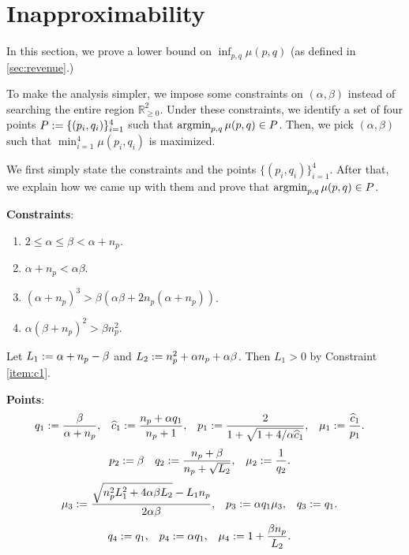 \section{Inapproximability}

In this section, we prove a lower bound on $\inf_{p, q} \mu(p, q)$ (as defined in \cref{sec:revenue}.)

To make the analysis simpler, we impose some constraints on $(\alpha, \beta)$
instead of searching the entire region $\mathbb{R}_{\ge 0}^2$.
Under these constraints, we identify a set of four points $P := \{(p_i, q_i)\}_{i=1}^4$
such that $\operatorname*{argmin}_{p,q} \mu(p, q) \in P$.
Then, we pick $(\alpha, \beta)$ such that $\min_{i=1}^4 \mu(p_i, q_i)$ is maximized.

We first simply state the constraints and the points $\{(p_i, q_i)\}_{i=1}^4$.
After that, we explain how we came up with them and prove that $\operatorname*{argmin}_{p,q} \mu(p, q) \in P$.

\textbf{Constraints}:
\begin{enumerate}
\item \label{item:c1}$2 \le \alpha \le \beta < \alpha + n_p$.
\item \label{item:c2}$\alpha + n_p < \alpha\beta$.
\item \label{item:c3}$(\alpha + n_p)^3 > \beta(\alpha\beta + 2n_p(\alpha + n_p))$.
\item \label{item:c4}$\alpha(\beta + n_p)^2 > \beta n_p^2$.
\end{enumerate}

Let $L_1 := \alpha + n_p - \beta$ and $L_2 := n_p^2 + \alpha n_p + \alpha\beta$.
Then $L_1 > 0$ by Constraint \ref{item:c1}.

\textbf{Points}:
\begin{align*}
q_1 &:= \frac{\beta}{\alpha + n_p},
    & \widehat{c}_1 &:= \frac{n_p + \alpha q_1}{n_p + 1},
    & p_1 &:= \frac{2}{1+\sqrt{1+4/\alpha\widehat{c}_1}},
    & \mu_1 &:= \frac{\widehat{c}_1}{p_1}.
\end{align*}
\begin{align*}
p_2 &:= \beta
    & q_2 &:= \frac{n_p+\beta}{n_p + \sqrt{L_2}},
    & \mu_2 &:= \frac{1}{q_2}.
\end{align*}
\begin{align*}
\mu_3 &:= \frac{\sqrt{n_p^2L_1^2 + 4\alpha\beta L_2} - L_1n_p}{2\alpha\beta},
    & p_3 &:= \alpha q_1 \mu_3,
    & q_3 &:= q_1.
\end{align*}
\begin{align*}
q_4 &:= q_1,
    & p_4 &:= \alpha q_1,
    & \mu_4 &:= 1 + \frac{\beta n_p}{L_2}.
\end{align*}

